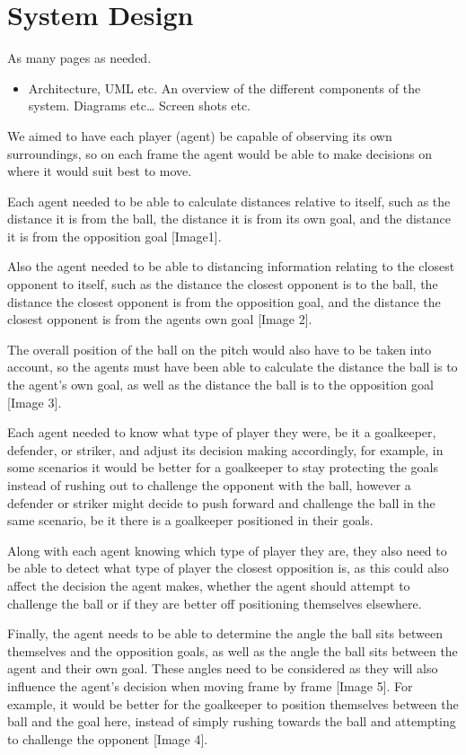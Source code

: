 
\chapter{System Design}
As many pages as needed.
\begin{itemize}
\item Architecture, UML etc. An overview of the different components of the system. Diagrams etc… Screen shots etc.
\end{itemize}

We aimed to have each player (agent) be capable of observing its own surroundings, so on each frame the agent would be able to make decisions on where it would suit best to move.

Each agent needed to be able to calculate distances relative to itself, such as the distance it is from the ball, the distance it is from its own goal, and the distance it is from the opposition goal [Image1]. 

Also the agent needed to be able to distancing information relating to the closest opponent to itself, such as the distance the closest opponent is to the ball, the distance the closest opponent is from the opposition goal, and the distance the closest opponent is from the agents own goal [Image 2]. 

The overall position of the ball on the pitch would also have to be taken into account, so the agents must have been able to calculate the distance the ball is to the agent's own goal, as well as the distance the ball is to the opposition goal [Image 3]. 

Each agent needed to know what type of player they were, be it a goalkeeper, defender, or striker, and adjust its decision making accordingly, for example, in some scenarios it would be better for a goalkeeper to stay protecting the goals instead of rushing out to challenge the opponent with the ball, however a defender or striker might decide to push forward and challenge the ball in the same scenario, be it there is a goalkeeper positioned in their goals.

Along with each agent knowing which type of player they are, they also need to be able to detect what type of player the closest opposition is, as this could also affect the decision the agent makes, whether the agent should attempt to challenge the ball or if they are better off positioning themselves elsewhere.

Finally, the agent needs to be able to determine the angle the ball sits between themselves and the opposition goals, as well as the angle the ball sits between the agent and their own goal. These angles need to be considered as they will also influence the agent’s decision when moving frame by frame [Image 5].
For example, it would be better for the goalkeeper to position themselves between the ball and the goal here, instead of simply rushing towards the ball and attempting to challenge the opponent [Image 4].

